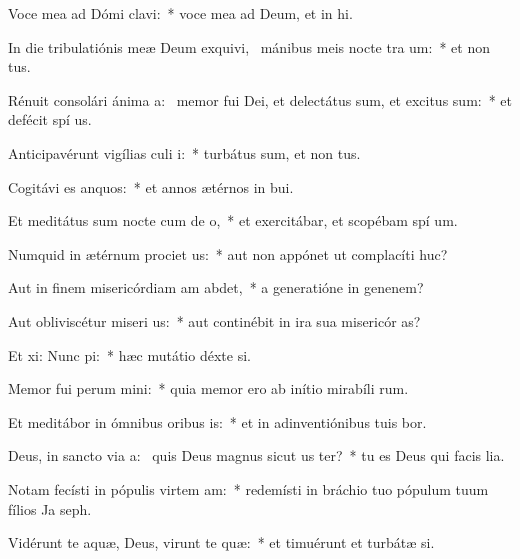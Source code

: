 \item Voce mea ad Dómi clavi:~* voce mea ad Deum, et in hi.
\item In die tribulatiónis meæ Deum exquivi,~\pscross{} mánibus meis nocte tra um:~* et non  tus.
\item Rénuit consolári ánima a:~\pscross{} memor fui Dei, et delectátus sum, et excitus sum:~* et defécit spí us.
\item Anticipavérunt vigílias culi i:~* turbátus sum, et non  tus.
\item Cogitávi es anquos:~* et annos ætérnos in  bui.
\item Et meditátus sum nocte cum de o,~* et exercitábar, et scopébam spí um.
\item Numquid in ætérnum prociet us:~* aut non appónet ut complacíti  huc?
\item Aut in finem misericórdiam am abdet,~* a generatióne in genenem?
\item Aut obliviscétur miseri us:~* aut continébit in ira sua misericór as?
\item Et xi: Nunc pi:~* hæc mutátio déxte si.
\item Memor fui perum mini:~* quia memor ero ab inítio mirabíli rum.
\item Et meditábor in ómnibus oribus is:~* et in adinventiónibus tuis bor.
\item Deus, in sancto via a:~\pscross{} quis Deus magnus sicut us ter?~* tu es Deus qui facis lia.
\item Notam fecísti in pópulis virtem am:~* redemísti in bráchio tuo pópulum tuum fílios Ja  seph.
\item Vidérunt te aquæ, Deus, virunt te quæ:~* et timuérunt et turbátæ  si.
